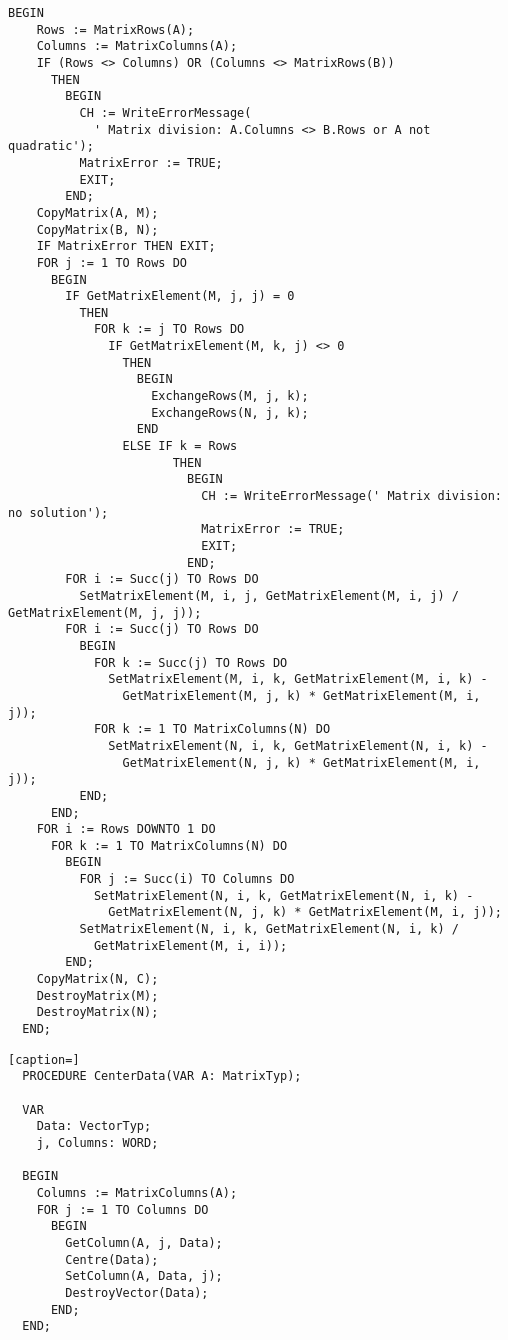 \begin{refsection}
\begin{lstlisting}[caption=division of two matrices]
  BEGIN
    Rows := MatrixRows(A);
    Columns := MatrixColumns(A);
    IF (Rows <> Columns) OR (Columns <> MatrixRows(B))
      THEN
        BEGIN
          CH := WriteErrorMessage(
            ' Matrix division: A.Columns <> B.Rows or A not quadratic');
          MatrixError := TRUE;
          EXIT;
        END;
    CopyMatrix(A, M);
    CopyMatrix(B, N);
    IF MatrixError THEN EXIT;
    FOR j := 1 TO Rows DO
      BEGIN
        IF GetMatrixElement(M, j, j) = 0
          THEN
            FOR k := j TO Rows DO
              IF GetMatrixElement(M, k, j) <> 0
                THEN
                  BEGIN
                    ExchangeRows(M, j, k);
                    ExchangeRows(N, j, k);
                  END
                ELSE IF k = Rows
                       THEN
                         BEGIN
                           CH := WriteErrorMessage(' Matrix division: no solution');
                           MatrixError := TRUE;
                           EXIT;
                         END;
        FOR i := Succ(j) TO Rows DO
          SetMatrixElement(M, i, j, GetMatrixElement(M, i, j) / GetMatrixElement(M, j, j));
        FOR i := Succ(j) TO Rows DO
          BEGIN
            FOR k := Succ(j) TO Rows DO
              SetMatrixElement(M, i, k, GetMatrixElement(M, i, k) -
                GetMatrixElement(M, j, k) * GetMatrixElement(M, i, j));
            FOR k := 1 TO MatrixColumns(N) DO
              SetMatrixElement(N, i, k, GetMatrixElement(N, i, k) -
                GetMatrixElement(N, j, k) * GetMatrixElement(M, i, j));
          END;
      END;
    FOR i := Rows DOWNTO 1 DO
      FOR k := 1 TO MatrixColumns(N) DO
        BEGIN
          FOR j := Succ(i) TO Columns DO
            SetMatrixElement(N, i, k, GetMatrixElement(N, i, k) -
              GetMatrixElement(N, j, k) * GetMatrixElement(M, i, j));
          SetMatrixElement(N, i, k, GetMatrixElement(N, i, k) /
            GetMatrixElement(M, i, i));
        END;
    CopyMatrix(N, C);
    DestroyMatrix(M);
    DestroyMatrix(N);
  END;
\end{lstlisting}

\begin{lstlisting}[caption=]
  PROCEDURE CenterData(VAR A: MatrixTyp);

  VAR
    Data: VectorTyp;
    j, Columns: WORD;

  BEGIN
    Columns := MatrixColumns(A);
    FOR j := 1 TO Columns DO
      BEGIN
        GetColumn(A, j, Data);
        Centre(Data);
        SetColumn(A, Data, j);
        DestroyVector(Data);
      END;
  END;
\end{lstlisting}



\end{refsection}
